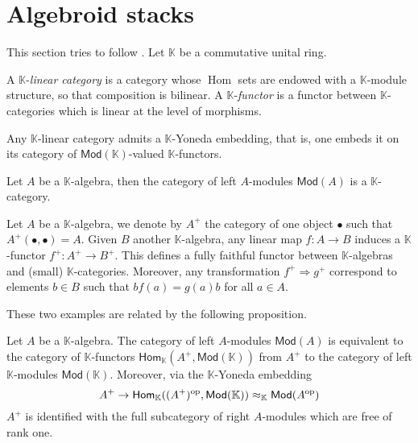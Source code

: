\section{Algebroid stacks}
This section tries to follow \cite[Section 1]{dagnolo-polesello_complex-involutive-submanifolds}. Let $\mathbb{K}$ be a commutative unital ring. 
\begin{definition}\label{def:linear-category}
	A $\mathbb{K}$-\emph{linear category} is a category whose $\operatorname{Hom}$ sets are endowed with a $\mathbb{K}$-module structure, so that composition is bilinear. A $\mathbb{K}$-\emph{functor} is a functor between $\mathbb{K}$-categories which is linear at the level of morphisms. 
\end{definition}
\begin{remark}\label{rem:linear-yoneda-lemma}
	Any $\mathbb{K}$-linear category admits a $\mathbb{K}$-Yoneda embedding, that is, one embeds it on its category of $\mathsf{Mod}(\mathbb{K})$-valued $\mathbb{K}$-functors. 
\end{remark}
\begin{example}\label{ex:linear-category-of-modules}
	Let $A$ be a $\mathbb{K}$-algebra, then the category of left $A$-modules $\mathsf{Mod}(A)$ is a $\mathbb{K}$-category.
\end{example}
\begin{example}\label{ex:linear-category-associated-to-an-alegbra}
	Let $A$ be a $\mathbb{K}$-algebra, we denote by $A^{+}$ the category of one object $\bullet$ such that $A^{+}(\bullet,\bullet) = A$. Given $B$ another $\mathbb{K}$-algebra, any linear map $f\colon A \to B$ induces a $\mathbb{K}$-functor $f^{+}\colon A^{+} \to B^{+}$. This defines a fully faithful functor between $\mathbb{K}$-algebras and (small) $\mathbb{K}$-categories. Moreover, any transformation $f^{+} \Rightarrow g^{+}$ correspond to elements $b\in B$ such that $bf(a) = g(a)b$ for all $a \in A$.
\end{example}
These two examples are related by the following proposition.
\begin{proposition}\label{prop:yoneda-for-linear-categories}
	Let $A$ be a $\mathbb{K}$-algebra. The category of left $A$-modules $\mathsf{Mod}(A)$ is equivalent to the category of $\mathbb{K}$-functors $\mathsf{Hom}_{\mathbb{K}}(A^{+}, \mathsf{Mod}(\mathbb{K}))$ from $A^{+}$ to the category of left $\mathbb{K}$-modules $\mathsf{Mod}(\mathbb{K})$. Moreover, via the $\mathbb{K}$-Yoneda embedding
	\[
		A^{+} \to \mathsf{Hom}_{\mathbb{K}}( (A^{+})^{{ \mathrm{op} }}, \mathsf{Mod}(\mathbb{K}) ) \approx_{\mathbb{K}} \mathsf{Mod}(A^{{ \mathrm{op} }})
	\]
	$A^{+}$ is identified with the full subcategory of right $A$-modules which are free of rank one.
\end{proposition}
